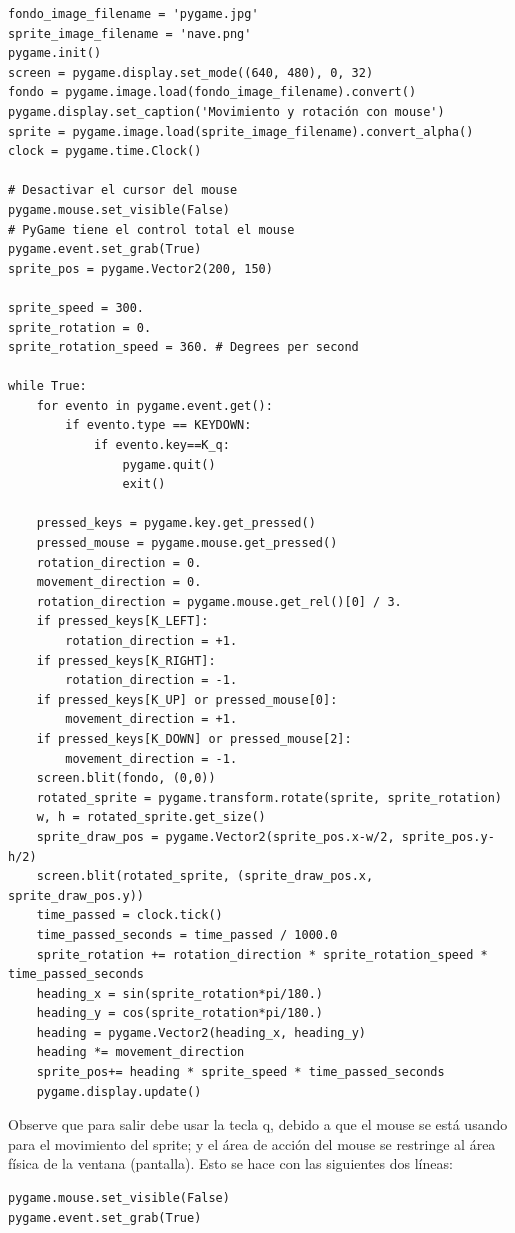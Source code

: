 {\begin{lstlisting}
fondo_image_filename = 'pygame.jpg'
sprite_image_filename = 'nave.png'
pygame.init()
screen = pygame.display.set_mode((640, 480), 0, 32)
fondo = pygame.image.load(fondo_image_filename).convert()
pygame.display.set_caption('Movimiento y rotación con mouse')
sprite = pygame.image.load(sprite_image_filename).convert_alpha()
clock = pygame.time.Clock()

# Desactivar el cursor del mouse
pygame.mouse.set_visible(False)
# PyGame tiene el control total el mouse
pygame.event.set_grab(True)
sprite_pos = pygame.Vector2(200, 150)

sprite_speed = 300.
sprite_rotation = 0.
sprite_rotation_speed = 360. # Degrees per second

while True:
    for evento in pygame.event.get():       
        if evento.type == KEYDOWN: 
            if evento.key==K_q:
                pygame.quit()
                exit()  
            
    pressed_keys = pygame.key.get_pressed()
    pressed_mouse = pygame.mouse.get_pressed()
    rotation_direction = 0.
    movement_direction = 0.
    rotation_direction = pygame.mouse.get_rel()[0] / 3.
    if pressed_keys[K_LEFT]:
        rotation_direction = +1.
    if pressed_keys[K_RIGHT]:
        rotation_direction = -1.
    if pressed_keys[K_UP] or pressed_mouse[0]:
        movement_direction = +1.
    if pressed_keys[K_DOWN] or pressed_mouse[2]:
        movement_direction = -1.
    screen.blit(fondo, (0,0))
    rotated_sprite = pygame.transform.rotate(sprite, sprite_rotation)
    w, h = rotated_sprite.get_size()
    sprite_draw_pos = pygame.Vector2(sprite_pos.x-w/2, sprite_pos.y-h/2)
    screen.blit(rotated_sprite, (sprite_draw_pos.x, sprite_draw_pos.y))
    time_passed = clock.tick()
    time_passed_seconds = time_passed / 1000.0
    sprite_rotation += rotation_direction * sprite_rotation_speed * time_passed_seconds
    heading_x = sin(sprite_rotation*pi/180.)
    heading_y = cos(sprite_rotation*pi/180.)
    heading = pygame.Vector2(heading_x, heading_y)
    heading *= movement_direction
    sprite_pos+= heading * sprite_speed * time_passed_seconds
    pygame.display.update()
\end{lstlisting}

Observe que para salir debe usar la tecla {\ttfamily q}, debido a que el mouse se está usando para el movimiento del sprite; y el área de acción del  mouse se restringe al área física de la ventana (pantalla). Esto se hace con las siguientes dos líneas:
\begin{lstlisting}		
pygame.mouse.set_visible(False)
pygame.event.set_grab(True)
\end{lstlisting}

}
